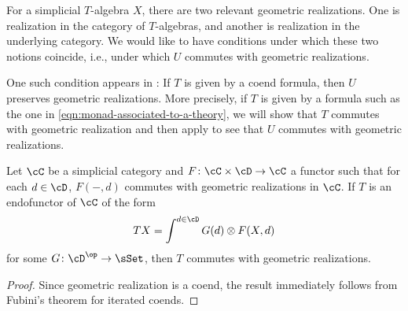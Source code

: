 \documentclass[leqno,oneside,english]{elsarticle}
\begin{document}
For a simplicial $T$-algebra $X$, there are two relevant geometric
realizations. One is realization in the category of $T$-algebras, and
another is realization in the underlying category.  We would like to
have conditions under which these two notions coincide, i.e., under
which $U$ commutes with geometric realizations. 

One such condition appears in \cite[Prop.~X.1.3.v]{EKMM97}: If $T$ is given by
a coend formula, then $U$ preserves geometric realizations. More
precisely, if $T$ is given by a formula such as the one in
\eqref{eqn:monad-associated-to-a-theory}, we will show that $T$ commutes
with geometric realization and then apply
 to see that $U$ commutes with 
geometric realizations. 

\begin{prop}\label{prop:commuting-with-geometric-realization}
Let $\cC$ be a simplicial category and $F\colon \cC\times \cD\rightarrow \cC$ a functor such that for each $d\in \cD$, $F(-,d)$ commutes with geometric realizations in $\cC$. If $T$ is an endofunctor of $\cC$ of the form \[TX= \int^{d\in \cD} G(d)\otimes F(X,d) \] for some $G\colon \cD^\op\rightarrow \sSet$, then $T$ commutes with geometric realizations. 
\end{prop}

\begin{proof}
Since geometric realization is a coend, the result immediately follows from Fubini's theorem for iterated coends.
\end{proof}
\end{document}
